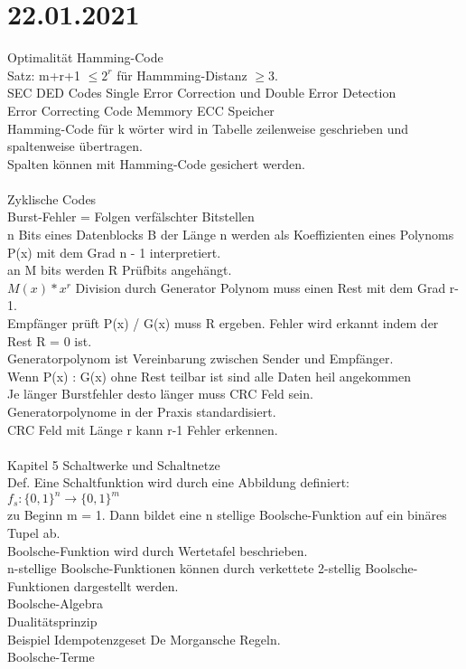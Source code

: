 \documentclass{article}
\begin{document}
	\section*{22.01.2021}
	Optimalität Hamming-Code \\
	Satz: m+r+1 $\leq 2^r$ für Hammming-Distanz $\geq$3. \\
	SEC DED Codes Single Error Correction und Double Error Detection \\
	Error Correcting Code Memmory ECC Speicher \\
	Hamming-Code für k wörter wird in Tabelle zeilenweise geschrieben und spaltenweise übertragen. \\
	Spalten können mit Hamming-Code gesichert werden. \\
	\\
	Zyklische Codes \\
	Burst-Fehler = Folgen verfälschter Bitstellen \\
	n Bits eines Datenblocks B der Länge n werden als Koeffizienten eines Polynoms P(x) mit dem Grad n - 1 interpretiert. \\
	an M bits werden R Prüfbits angehängt. \\
	$M(x) * x^r$ Division durch Generator Polynom muss einen Rest mit dem Grad r-1. \\
	Empfänger prüft P(x) / G(x) muss R ergeben. Fehler wird erkannt indem der Rest R = 0 ist. \\
	Generatorpolynom ist Vereinbarung zwischen Sender und Empfänger. \\
	Wenn P(x) : G(x) ohne Rest teilbar ist sind alle Daten heil angekommen \\
	Je länger Burstfehler desto länger muss CRC Feld sein. \\
	Generatorpolynome in der Praxis standardisiert. \\
	CRC Feld mit Länge r kann r-1 Fehler erkennen.
	\\
	\\
	Kapitel 5 Schaltwerke und Schaltnetze \\
	Def. Eine Schaltfunktion wird durch eine Abbildung definiert: \\
	$f_s: \{0,1\}^n \to \{0,1\}^m$ \\
	zu Beginn m = 1. Dann bildet eine n stellige Boolsche-Funktion auf ein binäres Tupel ab. \\
	Boolsche-Funktion wird durch Wertetafel beschrieben. \\
	n-stellige Boolsche-Funktionen können durch verkettete 2-stellig Boolsche-Funktionen dargestellt werden. \\
	Boolsche-Algebra \\
	Dualitätsprinzip \\
	Beispiel Idempotenzgeset De Morgansche Regeln. \\
	Boolsche-Terme \\
\end{document}
